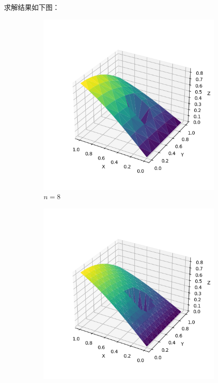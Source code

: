 \documentclass[lang=cn,a4paper,newtx,bibend=bibtex]{elegantpaper}
\begin{document}
求解结果如下图：

\begin{figure}[H]
  \centering
  \begin{subfigure}[b]{0.18\textwidth}
      \includegraphics[width=\textwidth]{../../res_bac/res-[data|2-mixed-irregular-a8].png}
      \caption{$n =  8$}
  \end{subfigure}
  \hfill
  \begin{subfigure}[b]{0.18\textwidth}
      \includegraphics[width=\textwidth]{../../res_bac/res-[data|2-mixed-irregular-b16].png}

\end{subfigure}
\end{figure}
\end{document}
